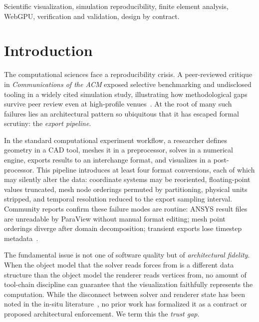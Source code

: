 \documentclass[journal]{IEEEtran}
\begin{document}
\begin{IEEEkeywords}
Scientific visualization, simulation reproducibility, finite element
analysis, WebGPU, verification and validation, design by contract.
\end{IEEEkeywords}

\section{Introduction}
\label{sec:introduction}

The computational sciences face a reproducibility crisis. A peer-reviewed
critique in \emph{Communications of the ACM} exposed selective benchmarking
and undisclosed tooling in a widely cited simulation study, illustrating
how methodological gaps survive peer review even at high-profile
venues~\cite{CACM2024}. At the root of many such failures lies an
architectural pattern so ubiquitous that it has escaped formal scrutiny:
the \emph{export pipeline}.

In the standard computational experiment workflow, a researcher defines
geometry in a CAD tool, meshes it in a preprocessor, solves in a numerical
engine, exports results to an interchange format, and visualizes in a
post-processor. This pipeline introduces at least four format conversions,
each of which may silently alter the data: coordinate systems may be
reoriented, floating-point values truncated, mesh node orderings permuted
by partitioning, physical units stripped, and temporal resolution reduced
to the export sampling interval. Community reports confirm these failure
modes are routine: ANSYS result files are unreadable by ParaView without
manual format editing; mesh point orderings diverge after domain
decomposition; transient exports lose timestep metadata~\cite{ParaView2024book}.

The fundamental issue is not one of software quality but of \emph{architectural
fidelity}. When the object model that the solver reads forces from is a
different data structure than the object model the renderer reads vertices
from, no amount of tool-chain discipline can guarantee that the visualization
faithfully represents the computation. While the disconnect between solver
and renderer state has been noted in the in-situ
literature~\cite{Catalyst2016,SENSEI2017}, no prior work has formalized it
as a contract or proposed architectural enforcement. We term this the
\emph{trust gap}.
\end{document}
